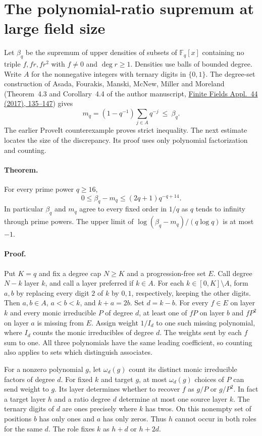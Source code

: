 \section{The polynomial-ratio supremum at large field size}
\label{sec:charging}
Let $\beta_q$ be the supremum of upper densities of subsets of
$\mathbb F_q[x]$ containing no triple $f,fr,fr^2$ with $f\ne0$ and
$\deg r\ge1$. Densities use balls of bounded degree. Write $A$ for the
nonnegative integers with ternary digits in $\{0,1\}$. The degree-set
construction of Asada, Fourakis, Manski, McNew, Miller and Moreland
(Theorem~4.3 and Corollary~4.4 of the author manuscript,
\href{https://doi.org/10.1016/j.ffa.2016.10.002}{Finite Fields Appl.\ 44
(2017), 135--147}) gives
\[
 m_q=(1-q^{-1})\sum_{j\in A}q^{-j}\ \le\ \beta_q .
\]
The earlier ProveIt counterexample proves strict inequality. The next
estimate locates the size of the discrepancy. Its proof uses only polynomial
factorization and counting.

\paragraph{Theorem.}
For every prime power $q\ge16$,
\[
 0\le \beta_q-m_q\le (2q+1)q^{-q+14}.
\]
In particular $\beta_q$ and $m_q$ agree to every fixed order in $1/q$ as
$q$ tends to infinity through prime powers. The upper limit of
$\log(\beta_q-m_q)/(q\log q)$ is at most $-1$.

\paragraph{Proof.}
Put $K=q$ and fix a degree cap $N\ge K$ and a progression-free set $E$.
Call degree $N-k$ layer $k$, and call a layer preferred if $k\in A$.
For each $k\in[0,K]\setminus A$, form $a,b$ by replacing every digit
$2$ of $k$ by $0,1$, respectively, keeping the other digits.
Then $a,b\in A$, $a<b<k$, and $k+a=2b$.
Set $d=k-b$. For every $f\in E$ on layer $k$ and every monic
irreducible $P$ of degree $d$, at least one of $fP$ on layer $b$ and
$fP^2$ on layer $a$ is missing from $E$. Assign weight $1/I_d$ to one
such missing polynomial, where $I_d$ counts the monic irreducibles of
degree $d$. The weights sent by each $f$ sum to one. All three polynomials
have the same leading coefficient, so counting also applies to sets which
distinguish associates.

For a nonzero polynomial $g$, let $\omega_d(g)$ count its distinct monic
irreducible factors of degree $d$. For fixed $k$ and target $g$, at most
$\omega_d(g)$ choices of $P$ can send weight to $g$. Its layer determines
whether to recover $f$ as $g/P$ or $g/P^2$.
In fact a target layer $h$ and a ratio degree $d$ determine at most
one source layer $k$. The ternary digits of $d$ are ones precisely
where $k$ has twos. On this nonempty set of positions $b$ has only ones
and $a$ has only zeros. Thus $h$ cannot occur in both roles for the same
$d$. The role fixes $k$ as $h+d$ or $h+2d$.

